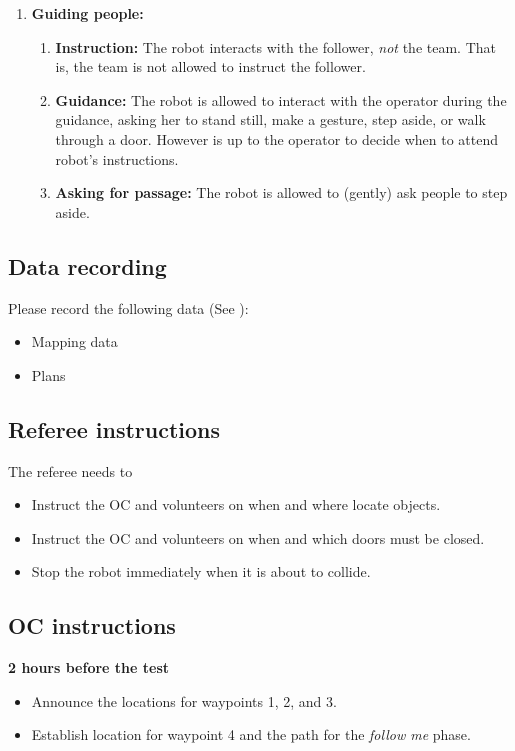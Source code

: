 \begin{enumerate}
	\item \textbf{Guiding people:} 
	\begin{enumerate}
		\item \textbf{Instruction:} The robot interacts with the follower, \emph{not} the team. That is, the team is not allowed to instruct the follower.
		\item \textbf{Guidance:} The robot is allowed to interact with the operator during the guidance, asking her to stand still, make a gesture, step aside, or walk through a door. However is up to the operator to decide when to attend robot's instructions.
		\item \textbf{Asking for passage:} The robot is allowed to (gently) ask people to step aside.
	\end{enumerate}
\end{enumerate}

\subsection{Data recording}
  Please record the following data (See ):
  \begin{itemize}
   \item Mapping data
   \item Plans
  \end{itemize}

\subsection{Referee instructions}

The referee needs to
\begin{itemize}
	\item Instruct the OC and volunteers on when and where locate objects.
	\item Instruct the OC and volunteers on when and which doors must be closed.
	\item Stop the robot immediately when it is about to collide.
\end{itemize}

\subsection{OC instructions}

\textbf{2 hours before the test}
\begin{itemize}
	\item Announce the locations for waypoints 1, 2, and 3.
	\item Establish location for waypoint 4 and the path for the \textit{follow me} phase. 
\end{itemize}

